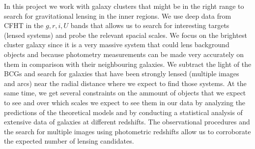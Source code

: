 In this project we work with galaxy clusters that might be in the right range to search for gravitational lensing in the inner regions. We use deep data from CFHT in the $g,r,i,U$ bands that allows us to search for interesting targets (lensed systems) and probe the relevant spacial scales. We focus on the brightest cluster galaxy since it is a very massive system that could lens background objects and because photometry measurements can be made very accurately on them in comparison with their neighbouring galaxies. We subtract the light of the BCGs and search for galaxies that have been strongly lensed (multiple images and arcs) near the radial distance where we expect to find those systems. At the same time, we get several constraints on the ammount of objects that we expect to see and over which scales we expect to see them in our data by analyzing the predictions of the theoretical models and by conducting a statistical analysis of extensive data of galaxies at different redshifts. The observational procedures and the search for multiple images using photometric redshifts allow us to corroborate the expected number of lensing candidates.    

